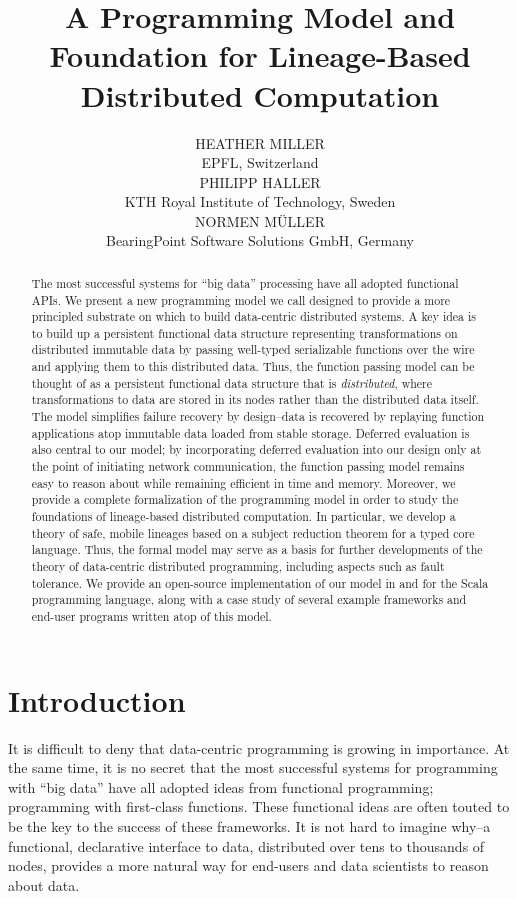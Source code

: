 \documentclass{jfp1}
\title[Journal of Functional Programming]{A Programming Model and Foundation for Lineage-Based Distributed Computation}
\author[H. Miller, P. Haller and N. M{\"u}ller]{%
  HEATHER MILLER\\ EPFL, Switzerland\\[1ex]%
  PHILIPP HALLER\\ KTH Royal Institute of Technology, Sweden\\[1ex]%
  NORMEN M{\"U}LLER\\ BearingPoint Software Solutions GmbH, Germany}%
\begin{document}
\label{firstpage}

\maketitle

\begin{abstract}
  The most successful systems for ``big data'' processing have all
  adopted functional APIs. We present a new programming model we call
  {\FP} designed to provide a more principled substrate on which to
  build data-centric distributed systems. A key idea is to build up a
  persistent functional data structure representing transformations on
  distributed immutable data by passing well-typed serializable
  functions over the wire and applying them to this distributed
  data. Thus, the function passing model can be thought of as a
  persistent functional data structure that is {\em distributed},
  where transformations to data are stored in its nodes rather than
  the distributed data itself. The model simplifies failure recovery
  by design--data is recovered by replaying function applications atop
  immutable data loaded from stable storage. Deferred evaluation is
  also central to our model; by incorporating deferred evaluation into
  our design only at the point of initiating network communication,
  the function passing model remains easy to reason about while
  remaining efficient in time and memory. Moreover, we provide a
  complete formalization of the programming model in order to study
  the foundations of lineage-based distributed computation. In
  particular, we develop a theory of safe, mobile lineages based on a
  subject reduction theorem for a typed core language. Thus, the
  formal model may serve as a basis for further developments of the
  theory of data-centric distributed programming, including aspects
  such as fault tolerance. We provide an open-source implementation of
  our model in and for the Scala programming language, along with a
  case study of several example frameworks and end-user programs
  written atop of this model.
\end{abstract}

\tableofcontents

\section{Introduction}

It is difficult to deny that data-centric programming is growing in importance.
At the same time, it is no secret that the most successful systems for
programming with ``big data'' have all adopted ideas from functional
programming; \ie programming with first-class functions. These functional
ideas are often touted to be the key to the success of these frameworks. It is
not hard to imagine why--a functional, declarative interface to data,
distributed over tens to thousands of nodes, provides a more natural way for
end-users and data scientists to reason about data.
\end{document}
